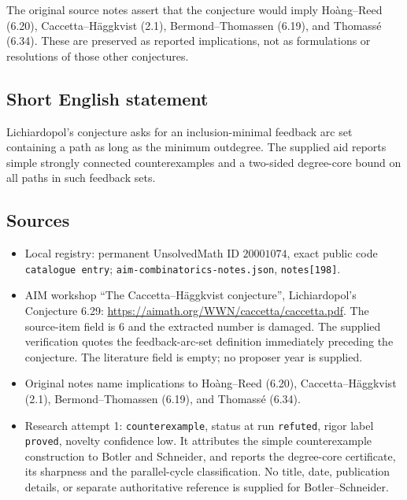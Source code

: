 \documentclass[11pt]{article}
\begin{document}
The original source notes assert that the conjecture would imply Hoàng--Reed (6.20), Caccetta--Häggkvist (2.1), Bermond--Thomassen (6.19), and Thomassé (6.34). These are preserved as reported implications, not as formulations or resolutions of those other conjectures.
\subsection{Short English statement}
Lichiardopol's conjecture asks for an inclusion-minimal feedback arc set containing a path as long as the minimum outdegree. The supplied aid reports simple strongly connected counterexamples and a two-sided degree-core bound on all paths in such feedback sets.
\subsection{Sources}
\begin{itemize}
\item Local registry: permanent UnsolvedMath ID \(20001074\), exact public code \texttt{catalogue entry}; \texttt{aim-combinatorics-notes.json}, \texttt{notes[198]}.
\item AIM workshop ``The Caccetta--Häggkvist conjecture'', Lichiardopol's Conjecture 6.29: \url{https://aimath.org/WWN/caccetta/caccetta.pdf}. The source-item field is 6 and the extracted number is damaged. The supplied verification quotes the feedback-arc-set definition immediately preceding the conjecture. The literature field is empty; no proposer year is supplied.
\item Original notes name implications to Hoàng--Reed (6.20), Caccetta--Häggkvist (2.1), Bermond--Thomassen (6.19), and Thomassé (6.34).
\item Research attempt 1: \texttt{counterexample}, status at run \texttt{refuted}, rigor label \texttt{proved}, novelty confidence low. It attributes the simple counterexample construction to Botler and Schneider, and reports the degree-core certificate, its sharpness and the parallel-cycle classification. No title, date, publication details, or separate authoritative reference is supplied for Botler--Schneider.
\end{itemize}
\end{document}
